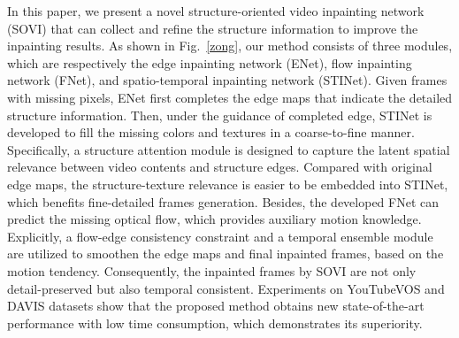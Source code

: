 In this paper, we present a novel structure-oriented video inpainting network (SOVI) that can collect and refine the structure information to improve the inpainting results. As shown in Fig.~\ref{zong}, our method consists of three modules, which are respectively the edge inpainting network (ENet), flow inpainting network (FNet), and spatio-temporal inpainting network (STINet).
Given frames with missing pixels, ENet first completes the edge maps that indicate the detailed structure information. Then, under the guidance of completed edge, STINet is developed to fill the missing colors and textures in a coarse-to-fine manner.
Specifically, a structure attention module is designed to capture the latent spatial relevance between video contents and structure edges.
Compared with original edge maps, the structure-texture relevance is easier to be embedded into STINet, which benefits fine-detailed frames generation.
Besides, the developed FNet can predict the missing optical flow, which provides auxiliary motion knowledge. Explicitly, a flow-edge consistency constraint and a temporal ensemble module are utilized to smoothen the edge maps and final inpainted frames, based on the motion tendency. Consequently, the inpainted frames by SOVI are not only detail-preserved but also temporal consistent.
Experiments on YouTubeVOS and DAVIS datasets show that the proposed method obtains new state-of-the-art performance with low time consumption, which demonstrates its superiority.

